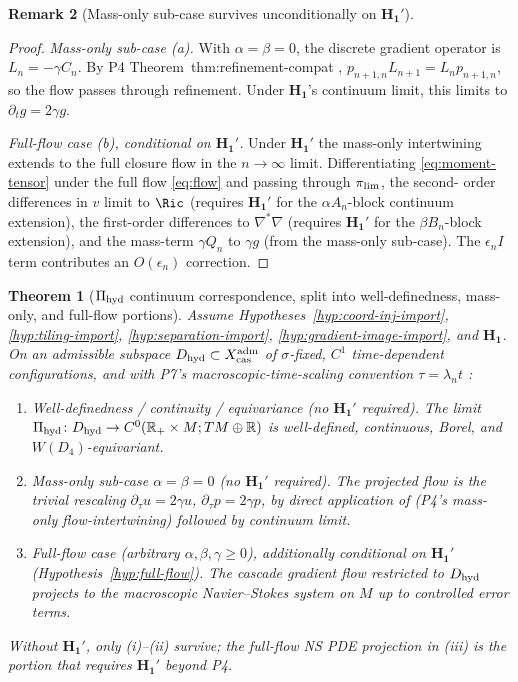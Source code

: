 \documentclass[11pt, a4paper]{amsart}
\newtheorem{theorem}{Theorem}[section]
\theoremstyle{definition}
\newtheorem{remark}[theorem]{Remark}
\newcommand{\R}{\mathbb{R}}
\newcommand{\cas}{{\rm cas}}
\newcommand{\hyd}{{\rm hyd}}
\begin{document}
\begin{remark}[Mass-only sub-case survives unconditionally on $\mathbf{H_1'}$]
\begin{proof}
\emph{Mass-only sub-case (a).} With $\alpha = \beta = 0$, the
discrete gradient operator is $L_n = -\gamma C_n$. By P4
Theorem~thm:refinement-compat \cite{CascadeClosureDynamics},
$p_{n+1, n} L_{n+1} = L_n p_{n+1, n}$, so the flow passes through
refinement. Under $\mathbf{H_1}$'s continuum limit, this limits to
$\partial_t g = 2\gamma g$.

\emph{Full-flow case (b), conditional on $\mathbf{H_1'}$.} Under
$\mathbf{H_1'}$ the mass-only intertwining extends to the full
closure flow in the $n \to \infty$ limit. Differentiating
\eqref{eq:moment-tensor} under the full flow
\eqref{eq:flow} and passing through $\pi_{\rm lim}$, the second-
order differences in $v$ limit to $\Ric$ (requires
$\mathbf{H_1'}$ for the $\alpha A_n$-block continuum extension),
the first-order differences to $\nabla^* \nabla$ (requires
$\mathbf{H_1'}$ for the $\beta B_n$-block extension), and the
mass-term $\gamma Q_n$ to $\gamma g$ (from the mass-only sub-case).
The $\epsilon_n I$ term contributes an $O(\epsilon_n)$ correction.
\end{proof}

\begin{theorem}[$\Pi_{\hyd}$ continuum correspondence, split into well-definedness, mass-only, and full-flow portions]
\label{thm:pihyd-cond}
Assume Hypotheses~\ref{hyp:coord-inj-import},
\ref{hyp:tiling-import}, \ref{hyp:separation-import},
\ref{hyp:gradient-image-import}, and $\mathbf{H_1}$. On an
admissible subspace $D_{\hyd} \subset X_\cas^{\rm adm}$ of
$\sigma$-fixed, $C^1$ time-dependent configurations, and with
P7's macroscopic-time-scaling convention $\tau = \lambda_n t$
\cite[Thm.~thm:projected-dynamics]{CascadeHydroProjection}:

\begin{enumerate}
\item[\textup{(i)}] \emph{Well-definedness / continuity /
  equivariance} (no $\mathbf{H_1'}$ required). The limit
  $\Pi_{\hyd} \colon D_{\hyd} \to C^0(\R_+ \times M; TM \oplus \R)$
  is well-defined, continuous, Borel, and $W(D_4)$-equivariant.
\item[\textup{(ii)}] \emph{Mass-only sub-case}
  $\alpha = \beta = 0$ (no $\mathbf{H_1'}$ required). The
  projected flow is the trivial rescaling $\partial_\tau u =
  2\gamma u$, $\partial_\tau p = 2\gamma p$, by direct application
  of \cite[Thm.~thm:refinement-compat]{CascadeClosureDynamics}
  (P4's mass-only flow-intertwining) followed by continuum limit.
\item[\textup{(iii)}] \emph{Full-flow case} (arbitrary
  $\alpha, \beta, \gamma \geq 0$), \emph{additionally conditional
  on $\mathbf{H_1'}$} (Hypothesis~\ref{hyp:full-flow}). The cascade
  gradient flow restricted to $D_{\hyd}$ projects to the
  macroscopic Navier--Stokes system on $M$ up to controlled error
  terms.
\end{enumerate}
Without $\mathbf{H_1'}$, only (i)--(ii) survive; the full-flow
NS PDE projection in (iii) is the portion that requires
$\mathbf{H_1'}$ beyond P4.
\end{theorem}


\end{remark}
\end{document}
